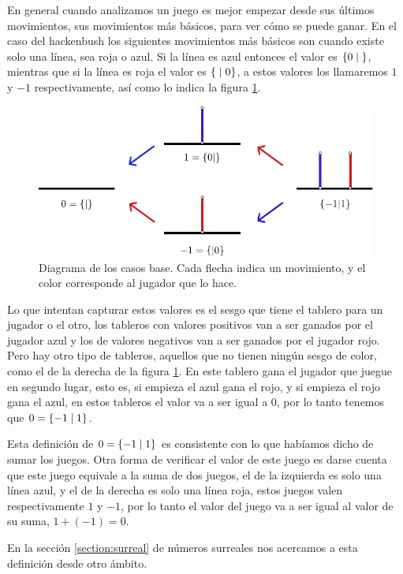 En general cuando analizamos un juego es mejor empezar desde sus \'ultimos movimientos, sus movimientos m\'as b\'asicos, para ver c\'omo se puede ganar. En el caso del hackenbush los siguientes movimientos m\'as b\'asicos son cuando existe solo una l\'inea, sea roja o azul. Si la l\'inea es azul entonces el valor es $\left\{0\;\middle|\; \right\}$, mientras que si la l\'inea es roja el valor es $\left\{\;\middle|\; 0\right\}$, a estos valores los llamaremos $1$ y $-1$ respectivamente, as\'i como lo indica la figura \ref{figure:hackenbush_roots}.

\begin{figure}[h]
    \centering
    \includegraphics[width=.7\textwidth]{images/hackenbush-surr_roots.pdf}
    \caption{Diagrama de los casos base. Cada flecha indica un movimiento, y el color corresponde al jugador que lo hace.}
    \label{figure:hackenbush_roots}
\end{figure}

Lo que intentan capturar estos valores es el sesgo que tiene el tablero para un jugador o el otro, los tableros con valores positivos van a ser ganados por el jugador azul y los de valores negativos van a ser ganados por el jugador rojo. Pero hay otro tipo de tableros, aquellos que no tienen ning\'un sesgo de color, como el de la derecha de la figura \ref{figure:hackenbush_roots}. En este tablero gana el jugador que juegue en segundo lugar, esto es, si empieza el azul gana el rojo, y si empieza el rojo gana el azul, en estos tableros el valor va a ser igual a $0$, por lo tanto tenemos que $0=\left\{-1\;\middle|\; 1\right\}$.

Esta definici\'on de $0=\left\{-1\;\middle|\; 1\right\}$ es consistente con lo que hab\'iamos dicho de sumar los juegos. Otra forma de verificar el valor de este juego es darse cuenta que este juego equivale a la suma de dos juegos, el de la izquierda es solo una l\'inea azul, y el de la derecha es solo una l\'inea roja, estos juegos valen respectivamente $1$ y $-1$, por lo tanto el valor del juego va a ser igual al valor de su suma, $1+(-1) = 0$.

En la secci\'on \ref{section:surreal} de n\'umeros surreales nos acercamos a esta definici\'on desde otro \'ambito.

